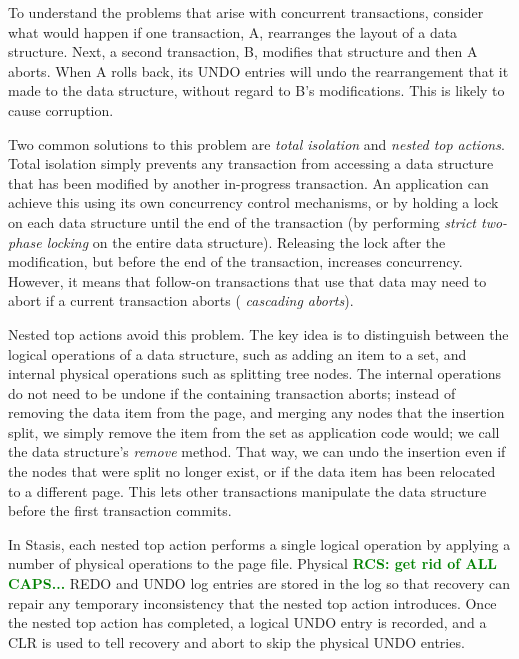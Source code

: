 \documentclass[letterpaper,twocolumn,10pt]{article}
\newcommand{\yad}{Stasis\xspace}
\newcommand{\yads}{Stasis'\xspace}
\newcommand{\rcs}[1]{\textcolor{green}{\bf RCS: #1}}
\begin{document}

To understand the problems that arise with concurrent transactions,
consider what would happen if one transaction, A, rearranges the
layout of a data structure.  Next, a second transaction, B,
modifies that structure and then A aborts.  When A rolls back, its
UNDO entries will undo the rearrangement that it made to the data
structure, without regard to B's modifications.  This is likely to
cause corruption.

Two common solutions to this problem are {\em total isolation} and
{\em nested top actions}.  Total isolation simply prevents any
transaction from accessing a data structure that has been modified by
another in-progress transaction.  An application can achieve this
using its own concurrency control mechanisms, or by holding a lock on
each data structure until the end of the transaction (by performing {\em strict two-phase locking} on the entire data structure).  
Releasing the
lock after the modification, but before the end of the transaction,
increases concurrency.  However, it means that follow-on transactions that use
that data may need to abort if a current transaction aborts ({\em
cascading aborts}). 


Nested top actions avoid this problem.  The key idea is to distinguish
between the logical operations of a data structure, such as
adding an item to a set, and internal physical operations such as
splitting tree nodes. 
The internal operations do not need to be undone if the
containing transaction aborts; instead of removing the data item from
the page, and merging any nodes that the insertion split, we simply
remove the item from the set as application code would; we call the
data structure's {\em remove} method.  That way, we can undo the
insertion even if the nodes that were split no longer exist, or if the
data item has been relocated to a different page.  This
lets other transactions manipulate the data structure before the first
transaction commits.

In \yad, each nested top action performs a single logical operation by applying
a number of physical operations to the page file.  Physical \rcs{get rid of ALL CAPS...} REDO and
UNDO log entries are stored in the log so that recovery can repair any
temporary inconsistency that the nested top action introduces.  Once
the nested top action has completed, a logical UNDO entry is recorded,
and a CLR is used to tell recovery and abort to skip the physical
UNDO entries.
\end{document}
